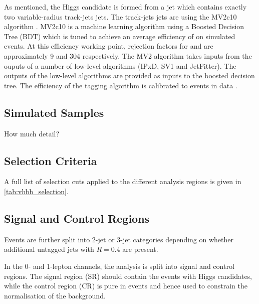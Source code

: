 %

%

As mentioned, the Higgs candidate is formed from a \largeR jet which contains exactly two \btagged variable-radius track-jets jets.
The track-jets jets are \btagged using the MV2c10 \btagging algorithm \cite{ATL-PHYS-PUB-2015-022,FTAG-2018-01,ATL-PHYS-PUB-2017-013}.
MV2c10 is a machine learning algorithm using a Boosted Decision Tree (BDT) which is tuned to achieve an average \bjet efficiency of  on simulated \ttbar events.
At this efficiency working point, rejection factors for \cjets and \ljets are approximately 9 and 304 respectively.
The MV2 algorithm takes inputs from the ouputs of a number of low-level algorithms (IPxD, SV1 and JetFitter).
The outputs of the low-level algorithms are provided as inputs to the boosted decision tree.
The efficiency of the tagging algorithm is calibrated to events in data \cite{PERF-2016-05,ATLAS-CONF-2018-006,ATLAS-CONF-2018-001}.


\subsection{Simulated Samples}

How much detail?
%


\subsection{Selection Criteria}\label{sec:vhbb_selections}

A full list of selection cuts applied to the different analysis regions is given in \cref{tab:vhbb_selection}.


%

%

\subsection{Signal and Control Regions}\label{sec:vhbb_control_region}



Events are further split into 2-jet or 3-jet categories depending on whether additional untagged \smallR jets with $R=0.4$ are present.


In the 0- and 1-lepton channels, the analysis is split into signal and control regions.
The signal region (SR) should contain the events with Higgs candidates, while the control region (CR) is pure in \ttbar events and hence used to constrain the normalisation of the \ttbar background.

